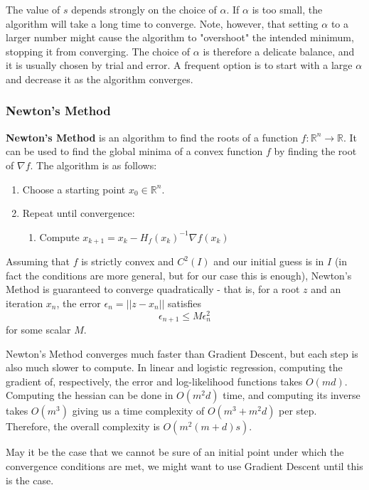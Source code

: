 \documentclass{article}
\newcommand{\R}{\mathbb{R}}
\begin{document}
The value of $s$ depends strongly on the choice of $\alpha$.
If $\alpha$ is too small, the algorithm will take a long time to converge.
Note, however, that setting $\alpha$ to a larger number might cause the algorithm to "overshoot" the intended minimum, stopping it from converging.
The choice of $\alpha$ is therefore a delicate balance, and it is usually chosen by trial and error.
A frequent option is to start with a large $\alpha$ and decrease it as the algorithm converges.

\subsubsection{Newton's Method}

\textbf{Newton's Method} is an algorithm to find the roots of a function $f: \R^n \to \R$.
It can be used to find the global minima of a convex function $f$ by finding the root of $\nabla f$.
The algorithm is as follows:
\begin{enumerate}
\item Choose a starting point $x_0 \in \R^n$.
\item Repeat until convergence:
\begin{enumerate}
\item Compute $x_{k+1} = x_k - H_f(x_k)^{-1} \nabla f(x_k)$
\end{enumerate}
\end{enumerate}

Assuming that $f$ is strictly convex and $C^2(I)$ and our initial guess is in $I$ (in fact the conditions are more general, but for our case this is enough), Newton's Method is guaranteed to converge quadratically - that is, for a root $z$ and an iteration $x_n$, the error $\epsilon_n = ||z - x_n||$ satisfies
$$
\epsilon_{n+1} \leq M \epsilon_n^2
$$
for some scalar $M$.

Newton's Method converges much faster than Gradient Descent, but each step is also much slower to compute.
In linear and logistic regression, computing the gradient of, respectively, the error and log-likelihood functions takes $O(md)$.
Computing the hessian can be done in $O(m^2d)$ time, and computing its inverse takes $O(m^3)$ giving us a time complexity of $O(m^3 + m^2d)$ per step.
Therefore, the overall complexity is $O(m^2(m+d)s)$.

May it be the case that we cannot be sure of an initial point under which the convergence conditions are met, we might want to use Gradient Descent until this is the case.
\end{document}
